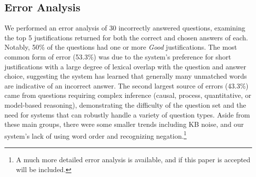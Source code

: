 \subsection{Error Analysis}
\label{sec:erroranalysis}

We performed an error analysis of 30 incorrectly answered questions, %
  examining the top 5 justifications returned for both the correct and chosen answers of each.    
Notably, 50\% of the questions had one or more \emph{Good} justifications. %
The most common form of error (53.3\%) was due to the system's preference for short justifications with a large degree of lexical overlap with the question and answer choice, %
suggesting the system has learned that generally many unmatched words are indicative of an incorrect answer.  %
The second largest source of errors (43.3\%) came from questions requiring complex inference (causal, process, quantitative, or model-based reasoning), demonstrating the difficulty of the question set and the need for systems that can robustly handle a variety of question types.
Aside from these main groups, there were some smaller trends including KB noise, and our system's lack of using word order and recognizing negation.\footnote{A much more detailed error analysis is available, and if this paper is accepted will be included.}
 


